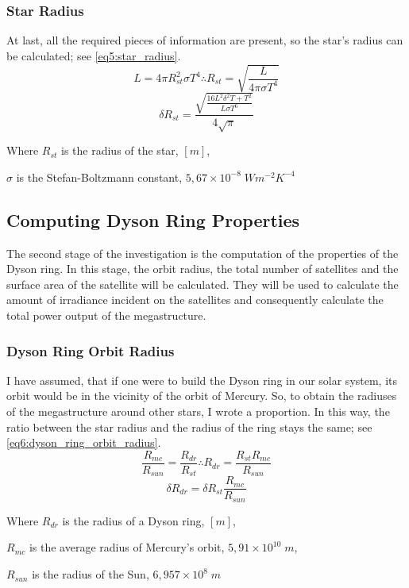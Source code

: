 \documentclass[stu, 11pt, a4paper, floatsintext]{apa7}
\begin{document}
	\subsubsection{Star Radius}
	At last, all the required pieces of information are present, so the star's radius can be calculated; see \cref{eq5:star_radius}.
	\begin{equation}
		\label{eq5:star_radius}
		L=4\pi R_{st}^2\sigma T^4 \therefore R_{st}=\sqrt{\frac{L}{4\pi\sigma T^4}}
	\end{equation}
	\begin{equation*}
		\delta R_{st}=\frac{\sqrt{\frac{16L^2\delta^2T+T^2}{L\sigma T^6}}}{4\sqrt{\pi}}
	\end{equation*}
	\begin{center}
		Where $R_{st}$ is the radius of the star, $[m]$,
		
 		$\sigma$ is the Stefan-Boltzmann constant, $5,67\times10^{-8}\;Wm^{-2}K^{-4}$
	\end{center}
	\subsection{Computing Dyson Ring Properties}
	The second stage of the investigation is the computation of the properties of the Dyson ring. In this stage, the orbit radius, the total number of satellites and the surface area of the satellite will be calculated. They will be used to calculate the amount of irradiance incident on the satellites and consequently calculate the total power output of the megastructure.
	\subsubsection{Dyson Ring Orbit Radius}
	I have assumed, that if one were to build the Dyson ring in our solar system, its orbit would be in the vicinity of the orbit of Mercury. So, to obtain the radiuses of the megastructure around other stars, I wrote a proportion. In this way, the ratio between the star radius and the radius of the ring stays the same; see \cref{eq6:dyson_ring_orbit_radius}.
	\begin{equation}
		\label{eq6:dyson_ring_orbit_radius}
		\frac{R_{mc}}{R_{sun}}=\frac{R_{dr}}{R_{st}} \therefore R_{dr}=\frac{R_{st}R_{mc}}{R_{sun}}
	\end{equation}
	\begin{equation*}
		\delta R_{dr}=\delta R_{st}\frac{R_{mc}}{R_{sun}}
	\end{equation*}
	\begin{center}
		Where $R_{dr}$ is the radius of a Dyson ring, $[m]$,
		
		$R_{mc}$ is the average radius of Mercury's orbit, $5,91\times10^{10}\;m$,
		
 		$R_{sun}$ is the radius of the Sun, $6,957\times10^8\;m$
	\end{center}
\end{document}
